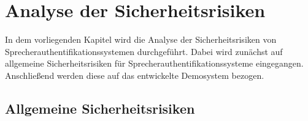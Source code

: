 \section{Analyse der Sicherheitsrisiken}
In dem vorliegenden Kapitel wird die Analyse der Sicherheitsrisiken von Sprecherauthentifikationssystemen durchgeführt.
Dabei wird zunächst auf allgemeine Sicherheitsrisiken für Sprecherauthentifikationssysteme eingegangen.
Anschließend werden diese auf das entwickelte Demosystem bezogen.

\subsection{Allgemeine Sicherheitsrisiken}


